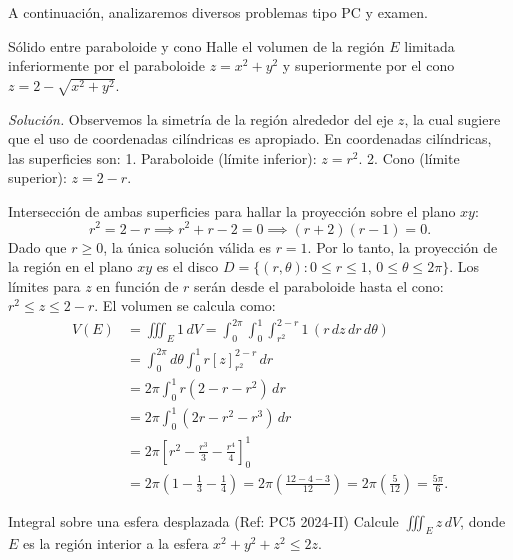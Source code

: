 \documentclass[11pt,a4paper]{article}
\begin{document}
A continuación, analizaremos diversos problemas tipo PC y examen.

\begin{ejemplobox}{Sólido entre paraboloide y cono}{}
    Halle el volumen de la región $E$ limitada inferiormente por el paraboloide $z = x^2 + y^2$ y superiormente por el cono $z = 2 - \sqrt{x^2+y^2}$.
\end{ejemplobox}

\textit{Solución.} Observemos la simetría de la región alrededor del eje $z$, la cual sugiere que el uso de coordenadas cilíndricas es apropiado.
En coordenadas cilíndricas, las superficies son:
1. Paraboloide (límite inferior): $z = r^2$.
2. Cono (límite superior): $z = 2 - r$.

Intersección de ambas superficies para hallar la proyección sobre el plano $xy$:
\[
r^2 = 2 - r \implies r^2 + r - 2 = 0 \implies (r+2)(r-1) = 0.
\]
Dado que $r \geq 0$, la única solución válida es $r=1$. Por lo tanto, la proyección de la región en el plano $xy$ es el disco $D = \{(r,\theta): 0 \leq r \leq 1, \, 0 \leq \theta \leq 2\pi\}$.
Los límites para $z$ en función de $r$ serán desde el paraboloide hasta el cono: $r^2 \leq z \leq 2-r$.
El volumen se calcula como:
\begin{align*}
V(E) &= \iiint_E 1 \, dV = \int_0^{2\pi} \int_0^1 \int_{r^2}^{2-r} 1 \, (r \, dz \, dr \, d\theta) \\
&= \int_0^{2\pi} d\theta \int_0^1 r [z]_{r^2}^{2-r} \, dr \\
&= 2\pi \int_0^1 r (2 - r - r^2) \, dr \\
&= 2\pi \int_0^1 (2r - r^2 - r^3) \, dr \\
&= 2\pi \left[ r^2 - \frac{r^3}{3} - \frac{r^4}{4} \right]_0^1 \\
&= 2\pi \left( 1 - \frac{1}{3} - \frac{1}{4} \right) = 2\pi \left( \frac{12 - 4 - 3}{12} \right) = 2\pi \left( \frac{5}{12} \right) = \frac{5\pi}{6}.
\end{align*}


\begin{ejerciciobox}{Integral sobre una esfera desplazada (Ref: PC5 2024-II)}{}
    Calcule $\iiint_{E} z \, dV$, donde $E$ es la región interior a la esfera $x^2 + y^2 + z^2 \leq 2z$.
\end{ejerciciobox}
\end{document}
